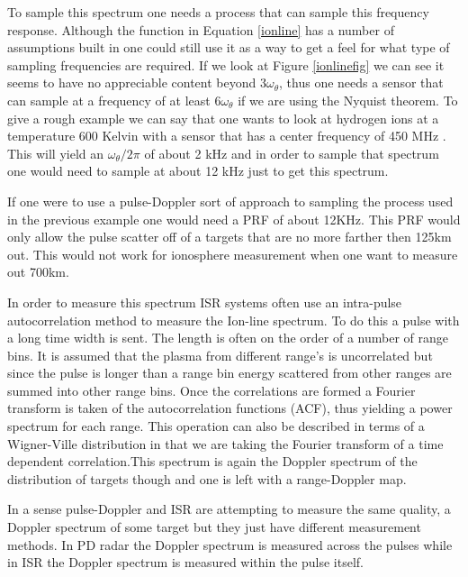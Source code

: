 To sample this spectrum one needs a process that can sample this frequency response.  Although the function in Equation \ref{ionline} has a number of assumptions built in one could still use it as a way to get a feel for what type of sampling frequencies are required.  If we look at Figure \ref{ionlinefig} we can see it seems to have no appreciable content beyond $3\omega_\theta$, thus one needs a sensor that can sample at a frequency of at least $6\omega_\theta$ if we are using the Nyquist theorem.  To give a rough example we can say that one wants to look at hydrogen ions at a  temperature 600 Kelvin with a sensor that has a center frequency of 450 MHz \footnotemark[1].  This will yield an $\omega_\theta/2\pi$ of about 2 kHz and in order to sample that spectrum one would need to sample at about 12 kHz just to get this spectrum.
  

If one were to use a pulse-Doppler sort of approach to sampling the process used in the previous example one would need a PRF of about 12KHz.  This PRF would only allow the pulse scatter off of a targets that are no more farther then 125km out.  This would not work for ionosphere measurement when one want to measure out 700km. 

In order to measure this spectrum ISR systems often use an intra-pulse autocorrelation method to measure the Ion-line spectrum.  To do this a pulse with a long time width is sent.  The length is often on the order of a number of range bins.  It is assumed that the plasma from different range's is uncorrelated but since the pulse is longer than a range bin energy scattered from other ranges are summed into other range bins.  Once the correlations are formed a Fourier transform is taken of the autocorrelation functions (ACF), thus yielding a power spectrum for each range.  This operation can also be described in terms of a Wigner-Ville distribution in that we are taking the Fourier transform of a time dependent correlation.\footnotemark[2] This spectrum is again the Doppler spectrum of the distribution of targets though and one is left with a range-Doppler map.

In a sense pulse-Doppler and ISR are attempting to measure the same quality, a Doppler spectrum of some target but they just have different measurement methods.  In PD radar the Doppler spectrum is measured across the pulses while in ISR the Doppler spectrum is measured within the pulse itself.  

